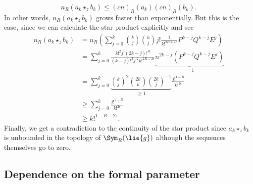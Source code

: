 \begin{example}
    \begin{equation*}
        n_R(a_k \star_z b_k)
        \leq
        (c n)_R(a_k) (c n)_R(b_k).
    \end{equation*}
    In other words, $n_R(a_k \star_z b_k)$ grows faster than
    exponentially. But this is the case, since we can calculate the star
    product explicitly and see
    \begin{align*}
        n_R(a_k \star_z b_k)
        & =
        n_R \left(
        \sum\limits_{j=0}^k
        \binom{k}{j}
        \binom{k}{j}
        j! \frac{1}{k!^{2R + 2 \epsilon}}
        P^{k-j} Q^{k-j} E^j
        \right)
        \\
        & =
        \sum\limits_{j=0}^k
        \frac{k!^2 j! (2k - j)!^R}
        {(k-j)!^2 j!^2 k!^{2R + 2 \epsilon}}
        \underbrace{
        n^{2k-j}
        ( P^{k-j} Q^{k-j} E^j )
        }_{= 1}
        \\
        & =
        \sum\limits_{j=0}^k
        \underbrace{
        \binom{k}{j}^2 \binom{2k}{k} \binom{2k}{j}^{-1}
        }_{\geq 1}
        \frac{j!^{1-R}}{k!^{2 \epsilon}}
        \\
        & \geq
        \sum\limits_{j=0}^k
        \frac{j!^{1-R}}{k!^{2 \epsilon}}
        \\
        & \geq
        k!^{1 - R - 2\epsilon}.
    \end{align*}
    Finally, we get a contradiction to the continuity of the star product 
    since $a_k \star_z b_k$ is unbounded in the topology of $\Sym_R(\lie{g})$ 
    although the sequences themselves go to zero.
\end{example}



\subsection{Dependence on the formal parameter}

